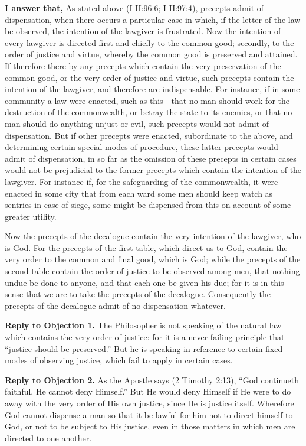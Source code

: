 \textbf{I answer that,} As stated above (I-II:96:6; I-II:97:4), precepts admit of dispensation, when there occurs a particular case in which, if the letter of the law be observed, the intention of the lawgiver is frustrated. Now the intention of every lawgiver is directed first and chiefly to the common good; secondly, to the order of justice and virtue, whereby the common good is preserved and attained. If therefore there by any precepts which contain the very preservation of the common good, or the very order of justice and virtue, such precepts contain the intention of the lawgiver, and therefore are indispensable. For instance, if in some community a law were enacted, such as this—that no man should work for the destruction of the commonwealth, or betray the state to its enemies, or that no man should do anything unjust or evil, such precepts would not admit of dispensation. But if other precepts were enacted, subordinate to the above, and determining certain special modes of procedure, these latter precepts would admit of dispensation, in so far as the omission of these precepts in certain cases would not be prejudicial to the former precepts which contain the intention of the lawgiver. For instance if, for the safeguarding of the commonwealth, it were enacted in some city that from each ward some men should keep watch as sentries in case of siege, some might be dispensed from this on account of some greater utility.

Now the precepts of the decalogue contain the very intention of the lawgiver, who is God. For the precepts of the first table, which direct us to God, contain the very order to the common and final good, which is God; while the precepts of the second table contain the order of justice to be observed among men, that nothing undue be done to anyone, and that each one be given his due; for it is in this sense that we are to take the precepts of the decalogue. Consequently the precepts of the decalogue admit of no dispensation whatever.

\textbf{Reply to Objection 1.} The Philosopher is not speaking of the natural law which contains the very order of justice: for it is a never-failing principle that ``justice should be preserved.'' But he is speaking in reference to certain fixed modes of observing justice, which fail to apply in certain cases.

\textbf{Reply to Objection 2.} As the Apostle says (2 Timothy 2:13), ``God continueth faithful, He cannot deny Himself.'' But He would deny Himself if He were to do away with the very order of His own justice, since He is justice itself. Wherefore God cannot dispense a man so that it be lawful for him not to direct himself to God, or not to be subject to His justice, even in those matters in which men are directed to one another.

